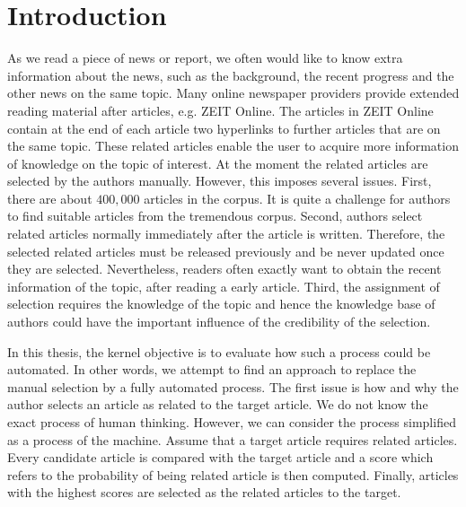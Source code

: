 \section{Introduction}

As we read a piece of news or report, we often would like to know extra information about the news, such as the background, the recent progress and the other news on the same topic. Many online newspaper providers provide extended reading material after articles, e.g. ZEIT Online. The articles in ZEIT Online contain at the end of each article two hyperlinks to further articles that are on the same topic. These related articles enable the user to acquire more information of knowledge on the topic of interest. At the moment the related articles are selected by the authors manually. However, this imposes several issues. First, there are about $400,000$ articles in the corpus. It is quite a challenge for authors to find suitable articles from the tremendous corpus. Second, authors select related articles normally immediately after the article is written. Therefore, the selected related articles must be released previously and be never updated once they are selected. Nevertheless, readers often exactly want to obtain the recent information of the topic, after reading a early article. Third, the assignment of selection requires the knowledge of the topic and hence the knowledge base of authors could have the important influence of the credibility of the selection.

In this thesis, the kernel objective is to evaluate how such a process could be automated. In other words, we attempt to find an approach to replace the manual selection by a fully automated process. The first issue is how and why the author selects an article as related to the target article. We do not know the exact process of human thinking.  However, we can consider the process simplified as a process of the machine. Assume that a target article requires related articles. Every candidate article is compared with the target article and a score which refers to the probability of being related article is then computed. Finally, articles with the highest scores are selected as the related articles to the target. 

